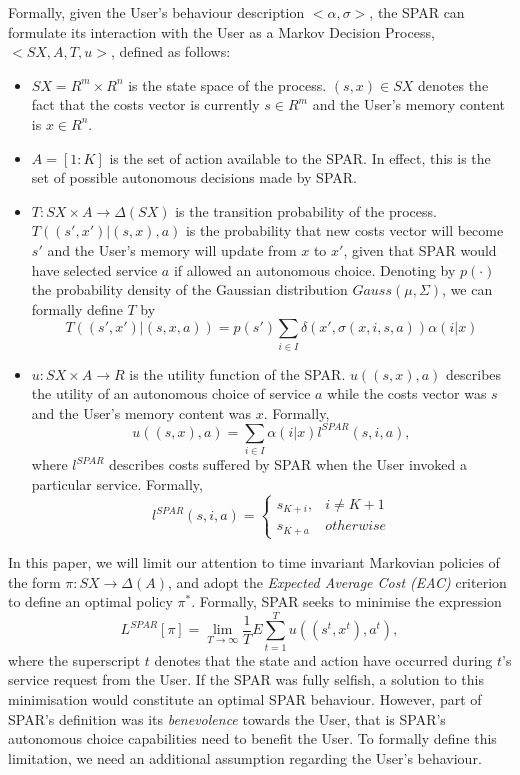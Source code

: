 \documentclass{msdm2012}
\begin{document}
Formally, given the User's behaviour description
$<\alpha,\sigma>$, the SPAR can formulate its interaction with the
User as a Markov Decision Process, $<SX, A, T, u>$, defined as
follows:
\begin{itemize}
\item $SX=R^m\times R^n$ is the state space of the process. $(s,x)\in
  SX$ denotes the fact that the costs vector is currently $s\in R^m$
  and the User's memory content is $x\in R^n$.
\item $A=[1:K]$ is the set of action available to the SPAR. In effect, this is the set of possible autonomous decisions made by SPAR. 
\item $T:SX\times A\rightarrow\Delta(SX)$ is the transition
  probability of the process. $T((s',x')|(s,x),a)$ is the probability
  that new costs vector will become $s'$ and the User's memory will
  update from $x$ to $x'$, given that SPAR would have selected service
  $a$ if allowed an autonomous choice. Denoting by $p(\cdot)$ the probability
  density of the Gaussian distribution $Gauss(\mu,\Sigma)$, we can
  formally define $T$ by
$$
T((s',x')|(s,x,a))=p(s')\sum\limits_{i\in I}\delta(x',\sigma(x,i,s,a))\alpha(i|x)
$$
\item $u:SX\times A\rightarrow R$ is the utility function of the
  SPAR. $u((s,x),a)$ describes the utility of an autonomous choice of
  service $a$ while the costs vector was $s$ and the
  User's memory content was $x$. Formally,
$$u((s,x),a)=\sum\limits_{i\in
    I}\alpha(i|x)l^{SPAR}(s,i,a),$$ where $l^{SPAR}$ describes costs suffered by
  SPAR when the User invoked a particular service. Formally, $$l^{SPAR}(s,i,a)=\begin{cases}s_{K+i},&i\neq K+1\\s_{K+a}&otherwise\end{cases}$$
\end{itemize}

In this paper, we will limit our attention to time invariant Markovian
policies of the form $\pi:SX\rightarrow\Delta(A)$, and adopt the {\em Expected Average Cost (EAC)} criterion to define an optimal policy $\pi^*$. Formally, SPAR seeks to minimise the expression 
$$
L^{SPAR}[\pi]=\lim\limits_{T\rightarrow\infty}\frac{1}{T}E\sum\limits_{t=1}^Tu((s^t,x^t),a^t),
$$ where the superscript $t$ denotes that the state and action have
occurred during $t$'s service request from the User. If the SPAR was
fully selfish, a solution to this minimisation would constitute an
optimal SPAR behaviour. However, part of SPAR's definition was its
{\em benevolence} towards the User, that is SPAR's autonomous choice
capabilities need to benefit the User. To formally define this
limitation, we need an additional assumption regarding the User's
behaviour.
\end{document}
